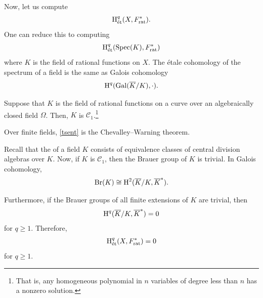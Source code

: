 \documentclass [11 pt, oneside] {article}
\begin{document}
Now, let us compute
\begin{align*}
	\operatorname{H}_{\textup {\'et}}^{q}(X,\relax{F}_{\textup {rat}}^{*}).
\end{align*}
One can reduce this to computing
\begin{align*}
	\operatorname{H}_{\textup {\'et}}^{q}(\operatorname{Spec}(K), \relax{F}_{\textup {rat}}^{*})
\end{align*}
where $K$ is the field of rational functions on $X$. 
The \'etale cohomology of the spectrum of a field is the same as Galois cohomology
\begin{align*}
	\operatorname{H}^{q}(\operatorname{Gal}(\overline{K}/K),\cdot).
\end{align*}
\begin{theorem}[Tsen]\label{tsent}\text{}
Suppose that $K$ is the field of rational functions on a curve over an algebraically closed field $\Omega$. Then, $K$ is $\mathscr{C}_{1}$.\footnote{That is, any homogeneous polynomial in $n$ variables of degree less than $n$ has a nonzero solution.}
\end{theorem}

\begin{remark}
	Over finite fields, \cref{tsent} is the Chevalley--Warning theorem.
\end{remark}

Recall that the  of a field $K$ consists of equivalence classes of central division algebras over $K$. 
Now, if $K$ is $\mathscr{C}_{1}$, then the Brauer group of $K$ is trivial. 
In Galois cohomology,
\begin{align*}
	\operatorname{Br}(K) \cong \operatorname{H}^{2}(\overline{K}/K, \overline{K}^*).
\end{align*}

Furthermore, if the Brauer groups of all finite extensions of $K$ are trivial, then
\begin{align*}
	\operatorname{H}^{q} (\overline{K}/K, \overline{K}^{*}) =0
\end{align*}
for $q\ge 1$.
Therefore,
\begin{align*}
	\operatorname{H}_{\textup {\'et}}^{q}(X,\relax{F}_{\textup {rat}}^{*}) = 0
\end{align*}
for $q\ge 1$.
\end{document}
